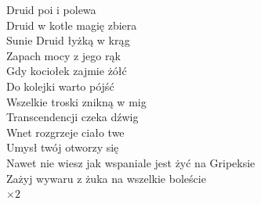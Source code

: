 \documentclass[a5paper, 10pt]{book}
\begin{document}
\begin{minipage}[t]{0.85\textwidth}
  Druid poi i polewa                   \\
  Druid w kotle magię zbiera\\
  Sunie Druid łyżką w krąg    \\
  Zapach mocy z jego rąk     \\
  Gdy kociołek zajmie żółć       \\
  Do kolejki warto pójść\\
  Wszelkie troski znikną w mig     \\
  Transcendencji czeka dźwig    \\
  \hspace*{3mm}Wnet rozgrzeje ciało twe          \\
  \hspace*{3mm}Umysł twój otworzy się\\

  \hspace*{6mm}Nawet nie wiesz jak wspaniale jest żyć na Gripeksie\\
  \hspace*{6mm}Zażyj wywaru z żuka na wszelkie boleście               \\
  \hspace*{2cm}$\times 2$\\
\end{minipage}
\end{document}
